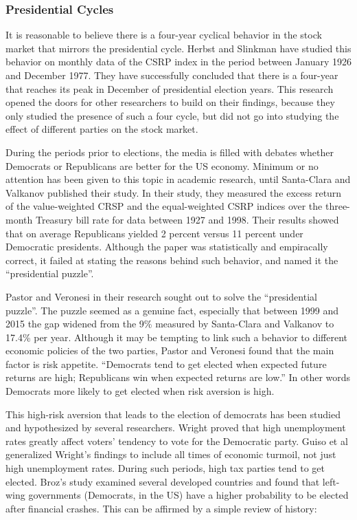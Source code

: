 \documentclass[]{book}
\begin{document}
\hypertarget{presidential-cycles}{%
\subsubsection{Presidential Cycles}\label{presidential-cycles}}

It is reasonable to believe there is a four-year cyclical behavior in the stock market that mirrors the presidential cycle. \citep{herbst1984political} Herbst and Slinkman have studied this behavior on monthly data of the CSRP index in the period between January 1926 and December 1977. They have successfully concluded that there is a four-year that reaches its peak in December of presidential election years. This research opened the doors for other researchers to build on their findings, because they only studied the presence of such a four cycle, but did not go into studying the effect of different parties on the stock market.

During the periods prior to elections, the media is filled with debates whether Democrats or Republicans are better for the US economy. Minimum or no attention has been given to this topic in academic research, until Santa-Clara and Valkanov published their study. In their study, they measured the excess return of the value-weighted CRSP and the equal-weighted CSRP indices over the three-month Treasury bill rate for data between 1927 and 1998. Their results showed that on average Republicans yielded 2 percent versus 11 percent under Democratic presidents. \citeyearpar{santa2003presidential} Although the paper was statistically and empiracally correct, it failed at stating the reasons behind such behavior, and named it the ``presidential puzzle''.

Pastor and Veronesi in their research sought out to solve the ``presidential puzzle''. The puzzle seemed as a genuine fact, especially that between 1999 and 2015 the gap widened from the 9\% measured by Santa-Clara and Valkanov to 17.4\% per year. Although it may be tempting to link such a behavior to different economic policies of the two parties, Pastor and Veronesi found that the main factor is risk appetite. ``Democrats tend to get elected when expected future returns are high; Republicans win when expected returns are low.'' \citeyearpar{pastor2017political} In other words Democrats more likely to get elected when risk aversion is high.

This high-risk aversion that leads to the election of democrats has been studied and hypothesized by several researchers. Wright \citeyearpar{wright2012unemployment} proved that high unemployment rates greatly affect voters' tendency to vote for the Democratic party. Guiso et al \citeyearpar{guiso2018time} generalized Wright's findings to include all times of economic turmoil, not just high unemployment rates. During such periods, high tax parties tend to get elected. Broz's study \citeyearpar{broz2013partisan} examined several developed countries and found that left-wing governments (Democrats, in the US) have a higher probability to be elected after financial crashes. This can be affirmed by a simple review of history:
\end{document}

